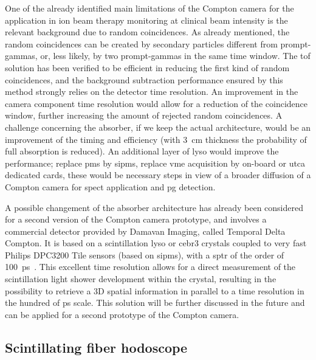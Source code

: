 One of the already identified main limitations of the Compton camera for the application in ion beam therapy monitoring at clinical beam intensity is the relevant background due to random coincidences. As already mentioned, the random coincidences can be created by secondary particles different from prompt-gammas, or, less likely, by two prompt-gammas in the same time window. The \gls{tof} solution has been verified to be efficient in reducing the first kind of random coincidences, and the background subtraction performance ensured by this method strongly relies on the detector time resolution. An improvement in the camera component time resolution would allow for a reduction of the coincidence window, further increasing the amount of rejected random coincidences. 
A challenge concerning the absorber, if we keep the actual architecture, would be an improvement of the timing and efficiency (with 3~cm thickness the probability of full absorption is reduced). An additional layer of \gls{lyso} would improve the performance; replace \glspl{pm} by \glspl{sipm}, replace \gls{vme} acquisition by on-board or \gls{utca} dedicated cards, these would be necessary steps in view of a broader diffusion of a Compton camera for \gls{spect} application and \gls{pg} detection.

A possible changement of the absorber architecture has already been considered for a second version of the Compton camera prototype, and involves a commercial detector provided by Damavan Imaging, called Temporal Delta Compton. It is based on a scintillation \gls{lyso} or \gls{cebr3} crystals coupled to very fast Philips DPC3200 Tile sensors (based on \glspl{sipm}), with a \gls{sptr} of the order of 100~ps~\parencite{Brunner2016}. This excellent time resolution allows for a direct measurement of the scintillation light shower development within the crystal, resulting in the possibility to retrieve a 3D spatial information in parallel to a time resolution in the hundred of ps scale. This solution will be further discussed in the future and can be applied for a second prototype of the Compton camera.  

\subsection{Scintillating fiber hodoscope}\label{chap3::subsec::hodoNext}

